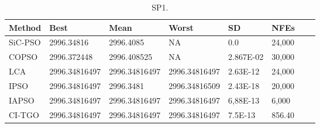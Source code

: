 
\begin{table*}[tp]
    \tiny
    \begin{center}
    
    \begin{tabular}{ P{2.0cm} P{2.0cm} P{2.0cm} P{2.0cm} P{2.0cm} P{2.0cm} P{2.0cm} P{2.0cm}  }
    \hline
    \textbf{Method} & \textbf{Best} & \textbf{Mean} & \textbf{Worst} & \textbf{SD} & \textbf{NFEs} \\
    \hline
    
    SiC-PSO & 2996.34816 & 2996.4085 & NA & 0.0 & 24,000 \\
    COPSO & 2996.372448 & 2996.408525 & NA & 2.867E-02 & 30,000 \\
    LCA & 2996.34816497 & 2996.34816497 & 2996.34816497 & 2.63E-12 & 24,000 \\
    IPSO & 2996.34816497 & 2996.3481 & 2996.34816509 & 2.43E-18 & 20,000 \\
    IAPSO & 2996.34816497 & 2996.34816497 & 2996.34816497 & 6,88E-13 & 6,000 \\
    CI-TGO & 2996.34816497 & 2996.34816497 & 2996.34816497 & 7.5E-13 & 856.40 \\
        
    \hline
    \end{tabular}
    \end{center}
    
    \caption{ SP1. \\[1em]}
    \label{tab:SP1}
    \end{table*}
    
    
